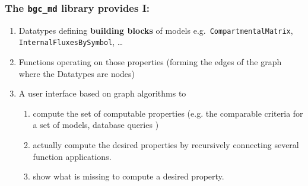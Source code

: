 \documentclass[unknownkeysallowed,usepdftitle=false]{beamer}
\begin{document}
\begin{frame}
  \frametitle{The \texttt{bgc\_md} library provides I:}
  
  \begin{enumerate}
    \item
      Datatypes defining {\bf building blocks} of models e.g.\ \texttt{CompartmentalMatrix}, \texttt{InternalFluxesBySymbol}, \dots     
    \item
      Functions operating on those properties (forming the edges of the graph where the Datatypes are nodes) 
    \item
      A user interface based on graph algorithms to  
    \begin{enumerate}
      \item
        compute the set of computable properties (e.g. the comparable criteria for a set of models, database queries ) 
      \item
        actually compute the desired properties by recursively connecting several function applications.
      \item
        show what is missing to compute a desired property.
    \end{enumerate}
  \end{enumerate}
\end{frame}
\end{document}
